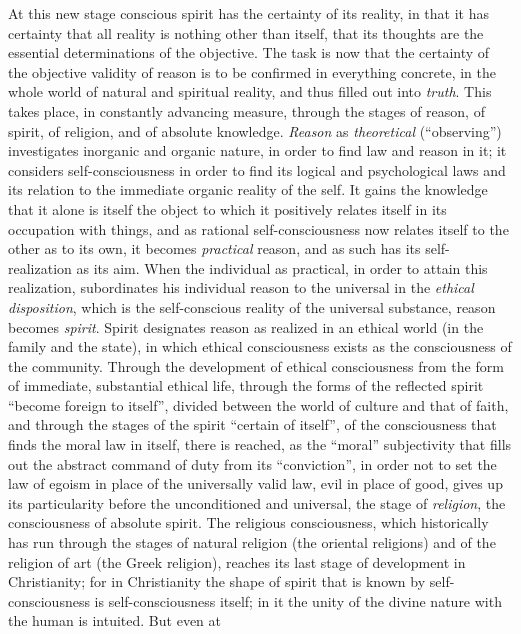 At this new stage conscious spirit has the certainty of its reality, in
that it has certainty that all reality is nothing other than itself,
that its thoughts are the essential determinations of the objective. The
task is now that the certainty of the objective validity of reason is
to be confirmed in everything concrete, in the whole world of natural
and spiritual reality, and thus filled out into \emph{truth}. This takes
place, in constantly advancing measure, through the stages of reason, of
spirit, of religion, and of absolute knowledge. \emph{Reason} as
\emph{theoretical} (``observing'') investigates inorganic and organic
nature, in order to find law and reason in it; it considers
self-consciousness in order to find its logical and psychological laws
and its relation to the immediate organic reality of the self.
It gains the knowledge that it alone is itself the object to
which it positively relates itself in its occupation with things, and as
rational self-consciousness now relates itself to the other as to its
own, it becomes \emph{practical} reason, and as such has its
self-realization as its aim. When the individual as practical, in order
to attain this realization, subordinates his individual reason to the
universal in the \emph{ethical disposition}, which is the self-conscious
reality of the universal substance, reason becomes \emph{spirit}. Spirit
designates reason as realized in an ethical world (in the family and the
state), in which ethical consciousness exists as the consciousness of
the community. Through the development of ethical consciousness from
the form of immediate, substantial ethical life, through the forms of
the reflected spirit ``become foreign to itself'', divided between the
world of culture and that of faith, and through the stages of the spirit
``certain of itself'', of the consciousness that finds the moral law in
itself, there is reached, as the ``moral'' subjectivity that fills out
the abstract command of duty from its ``conviction'', in order not to
set the law of egoism in place of the universally valid law, evil in
place of good, gives up its particularity before the unconditioned and
universal, the stage of \emph{religion}, the consciousness of absolute
spirit. The religious consciousness, which historically has run through
the stages of natural religion (the oriental religions) and of the
religion of art (the Greek religion), reaches its last stage of
development in Christianity; for in Christianity the shape of spirit
that is known by self-consciousness is self-consciousness itself; in it
the unity of the divine nature with the human is intuited. But even at

